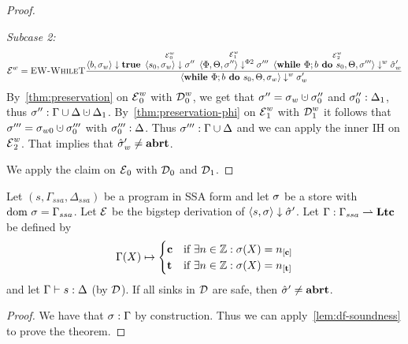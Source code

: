 \begin{proof}
\begin{claimproof}
        \emph{Subcase 2:}
        \begin{align*}
            \operatorname{\mathcal{E}}^w = \textsc{EW-WhileT}\frac{\displaystyle \overset{}{\langle b, \sigma_w \rangle \downarrow \textbf{true}} \enskip
            \overset{\operatorname{\mathcal{E}}^w_0}{\langle s_0, \sigma_w \rangle \downarrow \sigma''} \enskip
            \overset{\operatorname{\mathcal{E}}^w_1}{\langle \Phi, \Theta, \sigma'' \rangle \downarrow^{\Phi2} \sigma'''} \enskip
            \overset{\operatorname{\mathcal{E}}^w_2}{\langle \textbf{while }\Phi;{b} \textbf{ do } {s_0}, \Theta, \sigma''' \rangle \downarrow^w \hat{\sigma}'_w}}{\displaystyle \langle \textbf{while }\Phi;{b} \textbf{ do } {s_0}, \Theta, \sigma_w \rangle \downarrow^w \sigma_w'}
        \end{align*}
        By~\autoref{thm:preservation} on $\operatorname{\mathcal{E}}^w_0$ with $\operatorname{\mathcal{D}}^w_0$, we get that $\store'' = \store_w \dunion \store''_0$
        and ${\sigma''_0}:{\Delta_1}$, thus $\matches{\store''}{\Gamma \union \Delta \dunion \Delta_1}$.
        By~\autoref{thm:preservation-phi} on $\operatorname{\mathcal{E}}^w_1$ with $\operatorname{\mathcal{D}}_1^w$ it follows that $\store''' = \store_{w0} \dunion \store'''_0$
        with ${\sigma'''_0}:{\Delta}$.
        Thus ${\sigma'''}:{\Gamma \cup \Delta}$ and we can apply the inner IH on $\operatorname{\mathcal{E}}^w_2$.
        That implies that $\hat{\sigma}{}'_w \neq \textbf{abrt}$.
    \end{claimproof}
    We apply the claim on $\operatorname{\mathcal{E}}_0$ with $\operatorname{\mathcal{D}}_0$ and $\operatorname{\mathcal{D}}_1$.
\end{proof}

\begin{theorem}
    Let $(s, \Gamma_{ssa}, \Delta_{ssa})$ be a program in SSA form and let $\sigma$ be a store
    with $\text{dom }{\sigma} = \Gamma_{ssa}$.
    Let $\operatorname{\mathcal{E}}$ be the bigstep derivation of $\langle s, \sigma \rangle \downarrow \hat{\sigma}{}'$.
    Let $\Gamma: \Gamma_{ssa} \rightharpoonup \textbf{Ltc}$ be defined by
    \begin{align*}
        \Gamma(X) \mapsto \begin{cases}
            \lclean & \text{if $\exists n \in \Z: \store(X) = \clean$}\\
            \ltracked & \text{if $\exists n \in \Z: \store(X) = \tracked{}$}\\
        \end{cases}
    \end{align*}
    and let $\Gamma \vdash {s}: \Delta$ (by $\operatorname{\mathcal{D}}$).
    If all sinks in $\operatorname{\mathcal{D}}$ are safe, then $\hat{\sigma}{}' \neq \textbf{abrt}$.
\end{theorem}
\begin{proof}
    We have that ${\sigma}:{\Gamma}$ by construction.
    Thus we can apply~\autoref{lem:df-soundness} to prove the theorem.
\end{proof}

